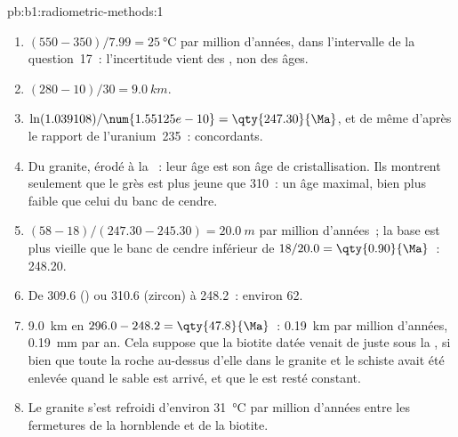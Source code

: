 \begin{solution}{pb:b1:radiometric-methods:1}
\begin{enumerate}
  \item $(550 - 350)/7.99 = \qty{25}{\celsius}$ par million d'années, dans l'intervalle
        de la question~17~: l'incertitude vient des , non
        des âges.
  \item $(280 - 10)/30 = \qty{9.0}{km}$.
  \item $\ln(1.039108)/\num{1.55125e-10} = \qty{247.30}{\Ma}$, et de même d'après
        le rapport de l'uranium~235~: concordants.
  \item Du granite, érodé à la ~: leur âge est son
        âge de cristallisation. Ils montrent seulement que le grès est plus jeune que
        \qty{310}{\Ma}~: un âge maximal, bien plus faible que celui du banc de cendre.
  \item $(58 - 18)/(247.30 - 245.30) = \qty{20.0}{m}$ par million d'années~; la base
        est plus vieille que le banc de cendre inférieur de $18/20.0 = \qty{0.90}{\Ma}$~:
        \qty{248.20}{\Ma}.
  \item De \qty{309.6}{\Ma} () ou \qty{310.6}{\Ma} (zircon) à
        \qty{248.2}{\Ma}~: environ \qty{62}{\Ma}.
  \item \qty{9.0}{km} en $296.0 - 248.2 = \qty{47.8}{\Ma}$~: \qty{0.19}{km} par
        million d'années, \qty{0.19}{mm} par an. Cela suppose que la biotite
        datée venait de juste sous la , si bien que toute la roche au-dessus
        d'elle dans le granite et le schiste avait été enlevée quand le sable est arrivé,
        et que le  est resté constant.
  \item Le granite s'est refroidi d'environ \qty{31}{\celsius} par million d'années
        entre les fermetures de la hornblende et de la biotite.
\end{enumerate}
\end{solution}
